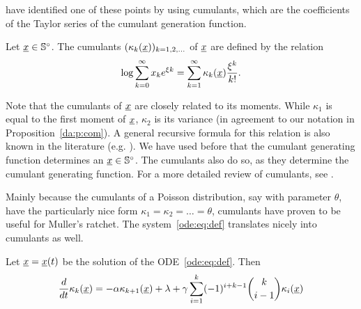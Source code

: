 \cite{depperschmidt_mathematical_2011} have identified one of these points by
using cumulants, which are the coefficients of the Taylor series of the cumulant generation function.

\begin{Definition}[Cumulants] \label{ode:d:cummulants}
Let $\underline{x} \in \mathbb{S}^\circ$. The cumulants $(\kappa_k(\underline{x}))_{k = 1,2,\ldots}$ of $\underline{x}$
are defined by the relation
\[
\log \sum_{k=0}^\infty x_k e^{\xi k}
= \sum_{k=1}^\infty \kappa_k(\underline{x}) \frac{\xi^k}{k!} .
\]
\end{Definition}

\noindent
Note that the cumulants of $\underline{x}$ are closely related to its moments. While $\kappa_1$ is
equal to the first moment of $\underline{x}$, $\kappa_2$ is its variance (in agreement to our
notation in Proposition~\ref{da:p:com}). A general recursive formula for this relation is also known
in the literature (e.g. \cite{ledermann_probability_1981}). We have used before
that the cumulant generating function determines an $\underline{x} \in \mathbb{S}^\circ$. The cumulants also do so,
as they determine the cumulant generating function. For a more detailed review
of cumulants, see \cite{burger_moments_1991}.

Mainly because the cumulants of a Poisson distribution, say with parameter $\theta$, have 
the particularly nice form $\kappa_1 = \kappa_2 = \ldots = \theta$, cumulants
have proven to be useful for Muller's ratchet. The system~\eqref{ode:eq:def} translates nicely into cumulants as well.

\begin{Proposition}
Let $\underline{x} =  \underline{x} \! \left( t \right) $ be the solution of the ODE~\eqref{ode:eq:def}. Then
\begin{align} \label{ode:eq:DeriveCum}
\frac{d}{dt} \kappa_k(\underline{x}) = -\alpha \kappa_{k+1}(\underline{x}) + \lambda + \gamma
\sum_{i=1}^{k} (-1)^{i+k-1} \binom{k}{i-1} \kappa_i(\underline{x})
\end{align}
\end{Proposition}

